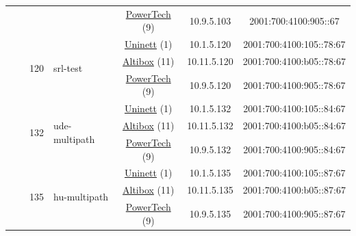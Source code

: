 \begin{small}
\begin{center}
\begin{longtable}{|c|c|c|c|c|c|c|c|}
  &  & \multicolumn{2}{|c|}{} & \multicolumn{2}{|c|}{\tiny{\href{http://www.powertech.no}{PowerTech} (9)}} & \tiny{10.9.5.103} & \tiny{2001:700:4100:905::67} \\* \cline{3-3}\cline{4-4}\cline{5-5}\cline{6-6}\cline{7-7}\cline{8-8}
  &  & \multirow{3}{*}{\tiny{120}} & \multicolumn{1}{|l|}{\multirow{3}{*}{\tiny{srl-test}}} & \multicolumn{2}{|c|}{\tiny{\href{https://www.uninett.no}{Uninett} (1)}} & \tiny{10.1.5.120} & \tiny{2001:700:4100:105::78:67} \\* \cline{5-5}\cline{6-6}\cline{7-7}\cline{8-8}
  &  &  &  & \multicolumn{2}{|c|}{\tiny{\href{https://www.altibox.no}{Altibox} (11)}} & \tiny{10.11.5.120} & \tiny{2001:700:4100:b05::78:67} \\* \cline{5-5}\cline{6-6}\cline{7-7}\cline{8-8}
  &  &  &  & \multicolumn{2}{|c|}{\tiny{\href{http://www.powertech.no}{PowerTech} (9)}} & \tiny{10.9.5.120} & \tiny{2001:700:4100:905::78:67} \\* \cline{3-3}\cline{4-4}\cline{5-5}\cline{6-6}\cline{7-7}\cline{8-8}
  &  & \multirow{3}{*}{\tiny{132}} & \multicolumn{1}{|l|}{\multirow{3}{*}{\tiny{ude-multipath}}} & \multicolumn{2}{|c|}{\tiny{\href{https://www.uninett.no}{Uninett} (1)}} & \tiny{10.1.5.132} & \tiny{2001:700:4100:105::84:67} \\* \cline{5-5}\cline{6-6}\cline{7-7}\cline{8-8}
  &  &  &  & \multicolumn{2}{|c|}{\tiny{\href{https://www.altibox.no}{Altibox} (11)}} & \tiny{10.11.5.132} & \tiny{2001:700:4100:b05::84:67} \\* \cline{5-5}\cline{6-6}\cline{7-7}\cline{8-8}
  &  &  &  & \multicolumn{2}{|c|}{\tiny{\href{http://www.powertech.no}{PowerTech} (9)}} & \tiny{10.9.5.132} & \tiny{2001:700:4100:905::84:67} \\* \cline{3-3}\cline{4-4}\cline{5-5}\cline{6-6}\cline{7-7}\cline{8-8}
  &  & \multirow{3}{*}{\tiny{135}} & \multicolumn{1}{|l|}{\multirow{3}{*}{\tiny{hu-multipath}}} & \multicolumn{2}{|c|}{\tiny{\href{https://www.uninett.no}{Uninett} (1)}} & \tiny{10.1.5.135} & \tiny{2001:700:4100:105::87:67} \\* \cline{5-5}\cline{6-6}\cline{7-7}\cline{8-8}
  &  &  &  & \multicolumn{2}{|c|}{\tiny{\href{https://www.altibox.no}{Altibox} (11)}} & \tiny{10.11.5.135} & \tiny{2001:700:4100:b05::87:67} \\* \cline{5-5}\cline{6-6}\cline{7-7}\cline{8-8}
  &  &  &  & \multicolumn{2}{|c|}{\tiny{\href{http://www.powertech.no}{PowerTech} (9)}} & \tiny{10.9.5.135} & \tiny{2001:700:4100:905::87:67} \\* \cline{3-3}\cline{4-4}\cline{5-5}\cline{6-6}\cline{7-7}\cline{8-8}

\end{longtable}
\end{center}
\end{small}
